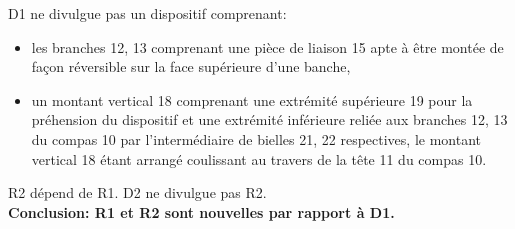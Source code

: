 D1 ne divulgue pas un dispositif comprenant:
\begin{itemize}
    \item les branches
12, 13 comprenant une pièce de liaison 15 apte à être montée de façon réversible sur la
face supérieure d’une banche,
    \item un montant vertical 18 comprenant une extrémité supérieure 19 pour la préhension du
dispositif et une extrémité inférieure reliée aux branches 12, 13 du compas 10 par
l’intermédiaire de bielles 21, 22 respectives, le montant vertical 18 étant arrangé
coulissant au travers de la tête 11 du compas 10.\\
\end{itemize}

R2 dépend de R1. D2 ne divulgue pas R2.\\

\textbf{Conclusion: R1 et R2 sont nouvelles par rapport à D1.}




